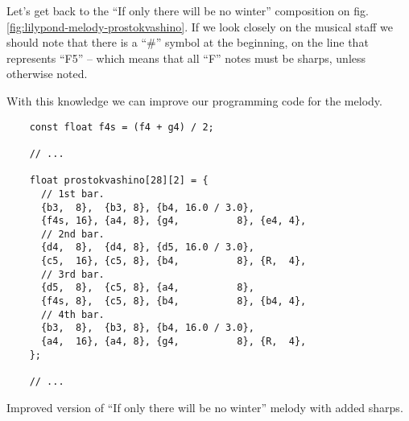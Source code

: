 \documentclass[../sparc.tex]{subfiles}
\begin{document}
Let's get back to the ``If only there will be no winter'' composition on
fig. \ref{fig:lilypond-melody-prostokvashino}.  If we look closely on the
musical staff we should note that there is a ``\#'' symbol at the beginning, on
the line that represents ``F5'' -- which means that all ``F'' notes must be
sharps, unless otherwise noted.

\begin{figure}[H]
\end{figure}

With this knowledge we can improve our programming code for the melody.

\begin{listing}[H]
  \begin{verbatim}
    const float f4s = (f4 + g4) / 2;

    // ...

    float prostokvashino[28][2] = {
      // 1st bar.
      {b3,  8},  {b3, 8}, {b4, 16.0 / 3.0},
      {f4s, 16}, {a4, 8}, {g4,          8}, {e4, 4},
      // 2nd bar.
      {d4,  8},  {d4, 8}, {d5, 16.0 / 3.0},
      {c5,  16}, {c5, 8}, {b4,          8}, {R,  4},
      // 3rd bar.
      {d5,  8},  {c5, 8}, {a4,          8},
      {f4s, 8},  {c5, 8}, {b4,          8}, {b4, 4},
      // 4th bar.
      {b3,  8},  {b3, 8}, {b4, 16.0 / 3.0},
      {a4,  16}, {a4, 8}, {g4,          8}, {R,  4},
    };

    // ...
  \end{verbatim}
  \label{listing:prostokvashino-with-shaprs}
  \caption{Improved version of ``If only there will be no winter'' melody with
    added sharps.}
\end{listing}
\end{document}
